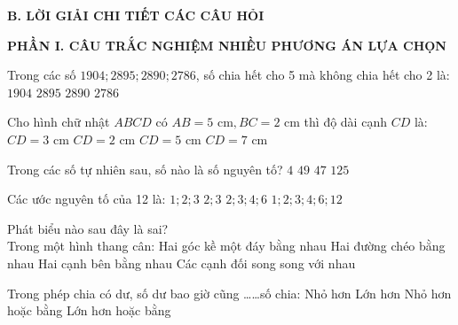 \documentclass[12pt,a4paper]{article}
\begin{document}
\noindent\textbf{\large B. LỜI GIẢI CHI TIẾT CÁC CÂU HỎI}
\vspace{2mm}

\noindent\textbf{\large PHẦN I. CÂU TRẮC NGHIỆM NHIỀU PHƯƠNG ÁN LỰA CHỌN}
\vspace{1mm}
\begin{ex}
Trong các số $1904; 2895; 2890; 2786$, số chia hết cho 5 mà không chia hết cho 2 là:
\choice
{$1904$}
{\True $2895$}
{$2890$}
{$2786$}
\end{ex}

\begin{ex}
Cho hình chữ nhật $ABCD$ có $AB = 5\text{ cm}, BC = 2\text{ cm}$ thì độ dài cạnh $CD$ là:
\choice
{$CD = 3\text{ cm}$}
{$CD = 2\text{ cm}$}
{\True $CD = 5\text{ cm}$}
{$CD = 7\text{ cm}$}
\end{ex}

\begin{ex}
Trong các số tự nhiên sau, số nào là số nguyên tố?
\choice
{$4$}
{$49$}
{\True $47$}
{$125$}
\end{ex}

\begin{ex}
Các ước nguyên tố của 12 là:
\choice
{$1; 2; 3$}
{\True $2; 3$}
{$2; 3; 4; 6$}
{$1; 2; 3; 4; 6; 12$}
\end{ex}

\begin{ex}
Phát biểu nào sau đây là sai?\\Trong một hình thang cân:
\choice
{Hai góc kề một đáy bằng nhau}
{Hai đường chéo bằng nhau}
{Hai cạnh bên bằng nhau}
{\True Các cạnh đối song song với nhau}
\end{ex}

\begin{ex}
Trong phép chia có dư, số dư bao giờ cũng \dots\dots số chia:
\choice
{\True Nhỏ hơn}
{Lớn hơn}
{Nhỏ hơn hoặc bằng}
{Lớn hơn hoặc bằng}
\end{ex}
\end{document}
